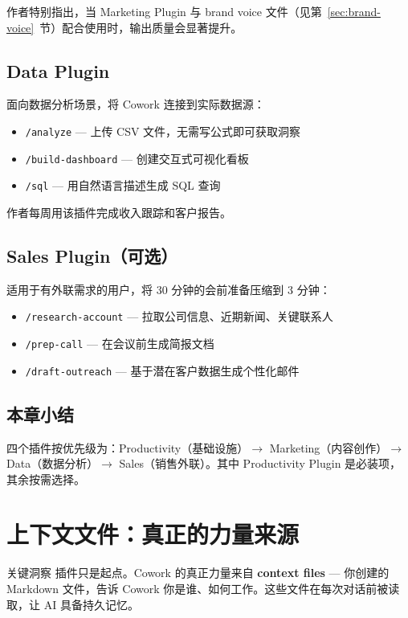 \documentclass[a4paper]{article}
\begin{document}
作者特别指出，当 Marketing Plugin 与 brand voice 文件（见第~\ref{sec:brand-voice}~节）配合使用时，输出质量会显著提升。

\subsection{Data Plugin}

面向数据分析场景，将 Cowork 连接到实际数据源：

\begin{itemize}
    \item \texttt{/analyze} --- 上传 CSV 文件，无需写公式即可获取洞察
    \item \texttt{/build-dashboard} --- 创建交互式可视化看板
    \item \texttt{/sql} --- 用自然语言描述生成 SQL 查询
\end{itemize}

作者每周用该插件完成收入跟踪和客户报告。

\subsection{Sales Plugin（可选）}

适用于有外联需求的用户，将 30 分钟的会前准备压缩到 3 分钟：

\begin{itemize}
    \item \texttt{/research-account} --- 拉取公司信息、近期新闻、关键联系人
    \item \texttt{/prep-call} --- 在会议前生成简报文档
    \item \texttt{/draft-outreach} --- 基于潜在客户数据生成个性化邮件
\end{itemize}

\subsection{本章小结}

四个插件按优先级为：Productivity（基础设施）$\to$ Marketing（内容创作）$\to$ Data（数据分析）$\to$ Sales（销售外联）。其中 Productivity Plugin 是必装项，其余按需选择。

\section{上下文文件：真正的力量来源}

\begin{importantbox}{关键洞察}
插件只是起点。Cowork 的真正力量来自 \textbf{context files} --- 你创建的 Markdown 文件，告诉 Cowork 你是谁、如何工作。这些文件在每次对话前被读取，让 AI 具备持久记忆。
\end{importantbox}
\end{document}
